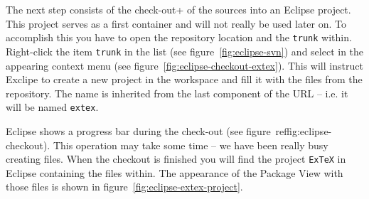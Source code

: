 The next step consists of the \+check-out+ of the sources into an Eclipse
project. This project serves as a first container and will not really
be used later on. To accomplish this you have to open the repository
location and the \texttt{trunk} within. Right-click
the item \texttt{trunk} in the list (see figure~\ref{fig:eclipse-svn})
and select  in the appearing context menu (see
figure~\ref{fig:eclipse-checkout-extex}). This will instruct Exclipe
to create a new project in the workspace and fill it with the files
from the repository. The name is inherited from the last component of
the URL -- i.e. it will be named \texttt{extex}.

Eclipse shows a progress bar during the check-out (see
figure~ref{fig:eclipse-checkout}). This operation may take some time
-- we have been really busy creating files. When the checkout is
finished you will find the project \texttt{ExTeX} in Eclipse
containing the files within. The appearance of the Package View with
those files is shown in figure~\ref{fig:eclipse-extex-project}.
